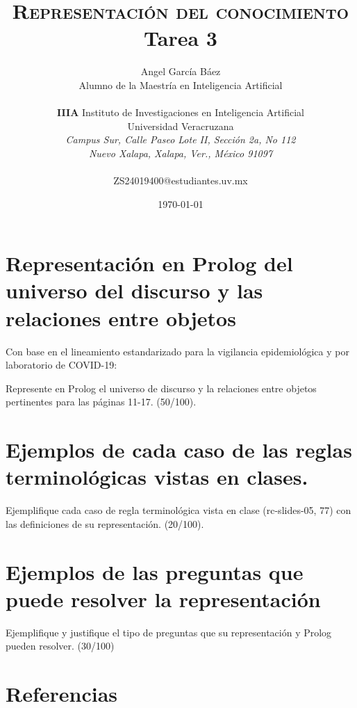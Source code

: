 \documentclass[11pt, letterpaper]{article}
\title{\textsc{Representación del conocimiento} \\
	Tarea 3
}
\author{Angel García Báez\\
	Alumno de la Maestría en Inteligencia Artificial \\ \\ \textbf{IIIA}
	Instituto de Investigaciones en Inteligencia Artificial \\
	Universidad Veracruzana \\ \emph{Campus Sur, Calle Paseo Lote II,
		Sección 2a, No 112} \\ \emph{Nuevo Xalapa, Xalapa, Ver., México 91097}
	\\ \\ ZS24019400@estudiantes.uv.mx}
\date{\today}
\begin{document}
	
\maketitle

\newpage
	
\section{Representación en Prolog del universo del discurso y las relaciones entre objetos}
	
Con base en el lineamiento estandarizado para la vigilancia epidemiológica y
por laboratorio de COVID-19:
	
Represente en Prolog el universo de discurso y la relaciones entre objetos
pertinentes para las páginas 11-17. (50/100).	
	
	
	
\newpage
	
\section{Ejemplos de cada caso de las reglas terminológicas vistas en clases.}
	
	Ejemplifique cada caso de regla terminológica vista en clase (rc-slides-05,
	77) con las definiciones de su representación. (20/100).
	

\newpage
	
\section{Ejemplos de las preguntas que puede resolver la representación}
	
	Ejemplifique y justifique el tipo de preguntas que su representación y Prolog
	pueden resolver. (30/100) \\
	

		
\newpage

\section{Referencias}  %

	
\end{document}
